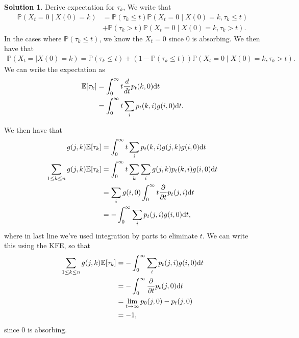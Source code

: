 \documentclass[12pt]{article}
\newcommand{\Prob}{\mathbb{P}}
\newcommand{\Expect}{\mathbb{E}}
\theoremstyle{definition}
\newtheorem{sol}{Solution}
\theoremstyle{remark}
\def\d{{\rm d}}
\begin{document}
\begin{sol}
    Derive expectation for $\tau_{k}$,
    We write that
    \begin{align*}
        \Prob( X_{t} = 0 \mid X(0) = k ) &=   \Prob(\tau_{k} \leq t)\Prob(X_{t} = 0 \mid X(0) = k, \tau_{k} \leq t)\\ 
                                         &+ \Prob(\tau_{k} > t) \Prob(X_{t} = 0 \mid X(0) = k, \tau_{k} > t) .
    \end{align*}
    In the cases where $\Prob(\tau_{k} \leq t)$, we know the $X_{t} = 0$ since 0 is absorbing. We then have that
    \begin{align*}
        \Prob( X_{t} = \mid X(0) = k ) = \Prob( \tau_{k} \leq t) + (1 -\Prob(\tau_{k} \leq t)) \Prob(X_{t} = 0 \mid X(0) = k, \tau_{k} > t) .
    \end{align*}
    We can write the expectation as 
    \begin{align*}
        \Expect[ \tau_{k} ] &= \int_{0}^{\infty} t \frac{d}{dt} p_{t}(k,0) \d t\\
                            &= \int_{0}^{\infty} t \sum_{i} p_{t}(k, i) g(i,0)\d t.
    \end{align*}

    We then have that
    \begin{align*}
        g(j,k) \Expect[\tau_{k}] &= \int_{0}^{\infty} t \sum_{i} p_{t}(k,i) g(j,k)g(i,0)  \d t\\
        \sum_{1\leq k \leq n} g(j,k) \Expect[\tau_{k}] &= \int_{0}^{\infty} t \sum_{k}\sum_{i} g(j,k)p_{t}(k,i) g(i,0) \d t\\
                                                       &= \sum_{i} g(i,0) \int_{0}^{\infty} t \frac{\partial }{\partial t} p_{t}(j,i) \d t \\
                                                       &= - \int_{0}^{\infty} \sum_{i} p_{t}(j,i) g(i,0) \d t,
    \end{align*}
    where in last line we've used integration by parts to eliminate $t$. We can write this using the KFE, so that
    \begin{align*}
       \sum_{1\leq k \leq n} g(j,k) \Expect[\tau_{k}] &= - \int_{0}^{\infty} \sum_{i} p_{t}(j,i) g(i,0) \d t\\
                                                      &= - \int_{0}^{\infty} \frac{\partial }{\partial t} p_{t}(j,0) \d t\\
                                                      &= \lim_{t\to \infty} p_{0}(j, 0) - p_{t}(j, 0)\\
                                                      &= - 1,
    \end{align*}
    since 0 is absorbing.


\end{sol}
\end{document}
